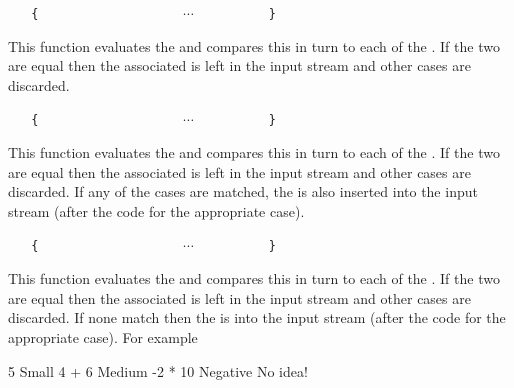 \documentclass[oneside]{book}
\begin{document}
\begin{function}{\IntCase}
\begin{syntax}
 
~ ~ \verb|{|
~ ~ ~ ~  
~ ~ ~ ~  
~ ~ ~ ~ $\cdots$
~ ~ ~ ~  
~ ~ \verb|}|
\end{syntax}
This function evaluates the  and
compares this in turn to each of the
. If the two are equal then the
associated  is left in the input stream
and other cases are discarded.
\end{function}

\begin{function}{\IntCaseT}
\begin{syntax}
 
~ ~ \verb|{|
~ ~ ~ ~  
~ ~ ~ ~  
~ ~ ~ ~ $\cdots$
~ ~ ~ ~  
~ ~ \verb|}|
~ ~ 
\end{syntax}
This function evaluates the  and
compares this in turn to each of the
. If the two are equal then the
associated  is left in the input stream
and other cases are discarded. If any of the
cases are matched, the  is also inserted into the
input stream (after the code for the appropriate case).
\end{function}

\begin{function}{\IntCaseF}
\begin{syntax}
 
~ ~ \verb|{|
~ ~ ~ ~  
~ ~ ~ ~  
~ ~ ~ ~ $\cdots$
~ ~ ~ ~  
~ ~ \verb|}|
~ ~ 
\end{syntax}
This function evaluates the  and
compares this in turn to each of the
. If the two are equal then the
associated  is left in the input stream
and other cases are discarded. If none
match then the  is into the input stream 
(after the code for the appropriate case).
For example
\begin{demohigh}
\IgnoreSpacesOn
{}
  {
    { 5 }       { Small }
    { 4 + 6 }   { Medium }
    { -2 * 10 } { Negative }
  }
  { No idea! }
\IgnoreSpacesOff
\end{demohigh}
\end{function}
\end{document}

